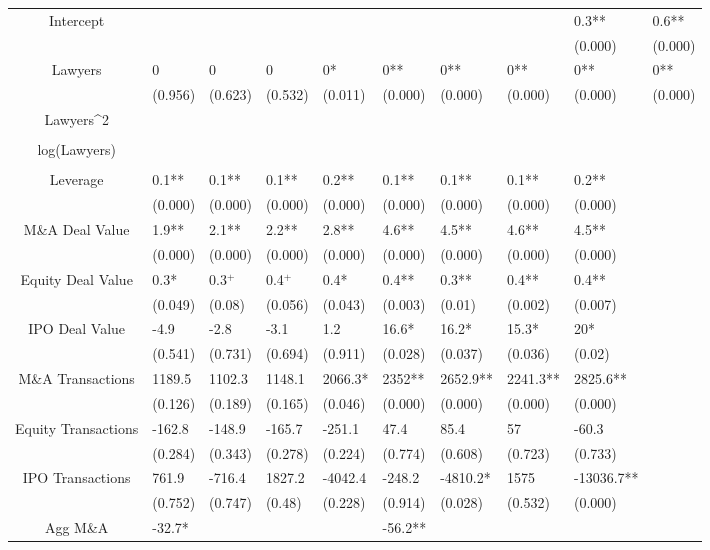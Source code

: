 \documentclass{article}
\begin{document}
\begin{table}[H]
\begin{tabular}{|clllllllll|}
Intercept &  &  &  &  &  &  &  & 0.3** & 0.6** \\ 
   &  &  &  &  &  &  &  & (0.000) & (0.000) \\ 
  Lawyers & 0 & 0 & 0 & 0* & 0** & 0** & 0** & 0** & 0** \\ 
   & (0.956) & (0.623) & (0.532) & (0.011) & (0.000) & (0.000) & (0.000) & (0.000) & (0.000) \\ 
  Lawyers^2 &  &  &  &  &  &  &  &  &  \\ 
   &  &  &  &  &  &  &  &  &  \\ 
  log(Lawyers) &  &  &  &  &  &  &  &  &  \\ 
   &  &  &  &  &  &  &  &  &  \\ 
  Leverage & 0.1** & 0.1** & 0.1** & 0.2** & 0.1** & 0.1** & 0.1** & 0.2** &  \\ 
   & (0.000) & (0.000) & (0.000) & (0.000) & (0.000) & (0.000) & (0.000) & (0.000) &  \\ 
  M\&A Deal Value & 1.9** & 2.1** & 2.2** & 2.8** & 4.6** & 4.5** & 4.6** & 4.5** &  \\ 
   & (0.000) & (0.000) & (0.000) & (0.000) & (0.000) & (0.000) & (0.000) & (0.000) &  \\ 
  Equity Deal Value & 0.3* & 0.3$^{+}$ & 0.4$^{+}$ & 0.4* & 0.4** & 0.3** & 0.4** & 0.4** &  \\ 
   & (0.049) & (0.08) & (0.056) & (0.043) & (0.003) & (0.01) & (0.002) & (0.007) &  \\ 
  IPO Deal Value & -4.9 & -2.8 & -3.1 & 1.2 & 16.6* & 16.2* & 15.3* & 20* &  \\ 
   & (0.541) & (0.731) & (0.694) & (0.911) & (0.028) & (0.037) & (0.036) & (0.02) &  \\ 
  M\&A Transactions & 1189.5 & 1102.3 & 1148.1 & 2066.3* & 2352** & 2652.9** & 2241.3** & 2825.6** &  \\ 
   & (0.126) & (0.189) & (0.165) & (0.046) & (0.000) & (0.000) & (0.000) & (0.000) &  \\ 
  Equity Transactions & -162.8 & -148.9 & -165.7 & -251.1 & 47.4 & 85.4 & 57 & -60.3 &  \\ 
   & (0.284) & (0.343) & (0.278) & (0.224) & (0.774) & (0.608) & (0.723) & (0.733) &  \\ 
  IPO Transactions & 761.9 & -716.4 & 1827.2 & -4042.4 & -248.2 & -4810.2* & 1575 & -13036.7** &  \\ 
   & (0.752) & (0.747) & (0.48) & (0.228) & (0.914) & (0.028) & (0.532) & (0.000) &  \\ 
  Agg M\&A & -32.7* &  &  &  & -56.2** &  &  &  &  \\ 

\end{tabular}
\end{table}
\end{document}
